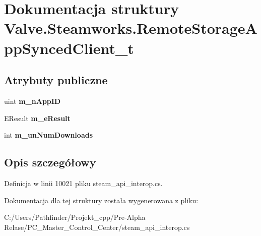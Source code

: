 \hypertarget{struct_valve_1_1_steamworks_1_1_remote_storage_app_synced_client__t}{}\section{Dokumentacja struktury Valve.\+Steamworks.\+Remote\+Storage\+App\+Synced\+Client\+\_\+t}
\label{struct_valve_1_1_steamworks_1_1_remote_storage_app_synced_client__t}
\subsection*{Atrybuty publiczne}
\begin{DoxyCompactItemize}
\item 
\mbox{\label{struct_valve_1_1_steamworks_1_1_remote_storage_app_synced_client__t_a816081ba036a8e9e9153b101aa180a4b}} 
uint {\bfseries m\+\_\+n\+App\+ID}
\item 
\mbox{\label{struct_valve_1_1_steamworks_1_1_remote_storage_app_synced_client__t_afb07fb91a87e42de88a15e92c3ab76b9}} 
E\+Result {\bfseries m\+\_\+e\+Result}
\item 
\mbox{\label{struct_valve_1_1_steamworks_1_1_remote_storage_app_synced_client__t_a722bfe5522563907bc6a3308c5e86002}} 
int {\bfseries m\+\_\+un\+Num\+Downloads}
\end{DoxyCompactItemize}


\subsection{Opis szczegółowy}


Definicja w linii 10021 pliku steam\+\_\+api\+\_\+interop.\+cs.



Dokumentacja dla tej struktury została wygenerowana z pliku\+:\begin{DoxyCompactItemize}
\item 
C\+:/\+Users/\+Pathfinder/\+Projekt\+\_\+cpp/\+Pre-\/\+Alpha Relase/\+P\+C\+\_\+\+Master\+\_\+\+Control\+\_\+\+Center/steam\+\_\+api\+\_\+interop.\+cs\end{DoxyCompactItemize}
